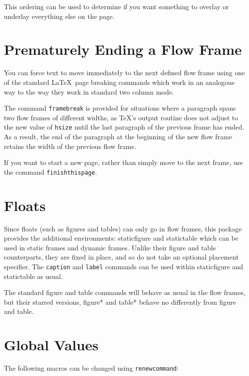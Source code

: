 \documentclass[a4paper,twoside]{book}
\newcommand{\env}[1]{\textsf{#1}}
\newcommand{\cmdname}[1]{\texttt{\symbol{92}#1}}
\begin{document}
This ordering can be used to determine if you want something
to overlay or underlay everything else on the page. 

\section{Prematurely Ending a Flow Frame}

You can force text to move immediately to the next defined
flow frame using one of the standard \LaTeX\ page breaking commands
which  work in an analogous way to the way they
work in standard two column mode. 

The command \cmdname{framebreak} is provided for situations
where a paragraph spans two flow frames
of different widths, as \TeX's output routine does not 
adjust to the new value of \cmdname{hsize} until the last 
paragraph of the previous frame has ended. As a 
result, the end of the paragraph at the beginning of the new
flow frame retains the width of the previous flow frame.

If you want to start a new page, rather than simply move to the 
next frame, use the command\newline
\cmdname{finishthispage}.

\section{Floats}

Since floats (such as figures and tables) can only go in 
{flow frames}, this package provides
the additional environments: 
\env{staticfigure} and  
\env{statictable} which can be used in static frames
and dynamic frames. Unlike their \env{figure} and
\env{table} counterparts, they are fixed in place, and
so do not take an optional placement specifier. The 
\cmdname{caption} and \cmdname{label} commands can 
be used within \env{staticfigure} and \env{statictable} as
usual.

The standard \env{figure} and \env{table} commands will 
behave as usual in the flow frames, but their starred versions,
\env{figure*} and \env{table*} behave no differently
from \env{figure} and \env{table}.

\section{Global Values}

The following macros can be changed using \cmdname{renewcommand}:
\end{document}
